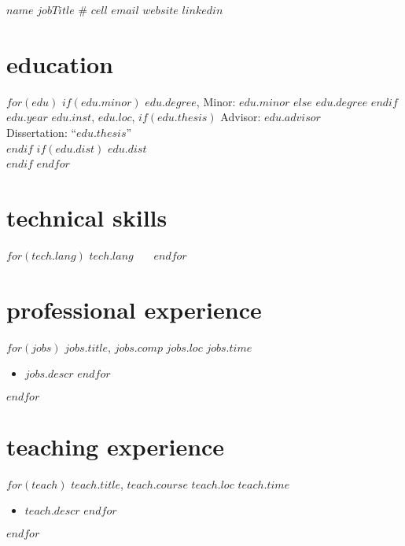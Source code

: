 \documentclass[]{friggeri-cv}
\begin{document}
\header
  {$name$}
  {$jobTitle$}
  {\# $cell$}
  {\href{mailto:$email$}{$email$}}
  {\href{$website$}{$website$}}
  {\href{$linkedin$}{$linkedin$}}



\vspace{-0.4in}
\section{education}
\begin{entrylist}
$for(edu)$
  \entrypub
  $if(edu.minor)$
    {$edu.degree$, Minor: $edu.minor$}
  $else$
    {$edu.degree$}
  $endif$
  {$edu.year$}
  {$edu.inst$, $edu.loc$, }
  $if(edu.thesis)$
    {Advisor: $edu.advisor$}\\
    {Dissertation: ``$edu.thesis$''}\\
  $endif$
  $if(edu.dist)$
    {$edu.dist$}\\
  $endif$
$endfor$
\end{entrylist}



\vspace{-0.1in}
\section{technical skills}
\vspace{-0.075in}
\begin{changemargin}{0.35in}{0in}
$for(tech.lang)$
  \textbf{$tech.lang$} \, \, \,
$endfor$
\end{changemargin}



\section{professional experience}
\begin{entrylist}
$for(jobs)$
  \entryalt
  {\textit{$jobs.title$}, $jobs.comp$}
  {$jobs.loc$}
  {$jobs.time$}
  \setlength\parskip{0pt}
  \begin{itemize}[noitemsep, leftmargin=0.2in]
    $for(jobs.descr)$
      \item $jobs.descr$
    $endfor$
  \end{itemize}
  \setlength\parskip{12pt}
$endfor$
\end{entrylist}



\section{teaching experience}
\begin{entrylist}
$for(teach)$
  \entryalt
  {\textit{$teach.title$}, $teach.course$}
  {$teach.loc$}
  {$teach.time$}
  \setlength\parskip{0pt}
  \begin{itemize}[noitemsep, leftmargin=0.2in]
    $for(teach.descr)$
      \item $teach.descr$
    $endfor$
  \end{itemize}
  \setlength\parskip{12pt}
$endfor$
\end{entrylist}
\end{document}
